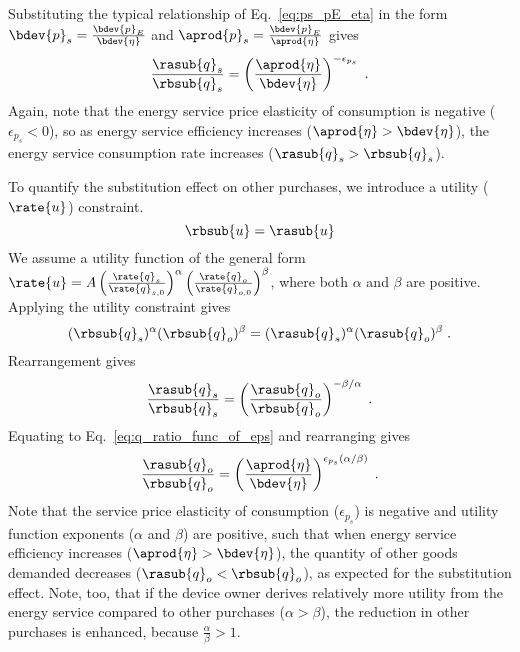 Substituting the typical relationship of Eq.~\ref{eq:ps_pE_eta} in the form
$\bdev{p}_s = \frac{\bdev{p}_E}{\bdev{\eta}}$ and
$\aprod{p}_s = \frac{\bdev{p}_E}{\aprod{\eta}}$
gives 
%
\begin{equation} \label{eq:q_ratio_func_of_eps}
  \frac{\rasub{q}_s}{\rbsub{q}_s} = \left( \frac{\aprod{\eta}}{\bdev{\eta}} \right)^{-\epsilon_{p_s}} \; .
\end{equation}
%
Again, note that the energy service price elasticity of consumption
is negative ($\epsilon_{p_s} < 0$), so
as energy service efficiency increases ($\aprod{\eta} > \bdev{\eta}$),
the energy service consumption rate increases ($\rasub{q}_s > \rbsub{q}_s$).

To quantify the substitution effect on other purchases,
we introduce a utility ($\rate{u}$) constraint.
%
\begin{equation}
  \rbsub{u} = \rasub{u}
\end{equation}
%
We assume a utility function of the general form
$\rate{u} = A \left( \frac{\rate{q}_s}{\rate{q}_{s,0}} \right)^\alpha \left( \frac{\rate{q}_o}{\rate{q}_{o,0}} \right)^\beta$,
where both $\alpha$ and $\beta$ are positive.
Applying the utility constraint gives
%
\begin{equation}
  (\rbsub{q}_s)^\alpha (\rbsub{q}_o)^\beta = (\rasub{q}_s)^\alpha (\rasub{q}_o)^\beta \; .
\end{equation}
%
Rearrangement gives
%
\begin{equation}
  \frac{\rasub{q}_s}{\rbsub{q}_s} = \left( \frac{\rasub{q}_o}{\rbsub{q}_o} \right) ^ {- \beta / \alpha } \; .
\end{equation}
%
Equating to Eq.~\ref{eq:q_ratio_func_of_eps} and rearranging gives
%
\begin{equation} \label{eq:qohat_qostar}
  \frac{\rasub{q}_o}{\rbsub{q}_o} = \left( \frac{\aprod{\eta}}{\bdev{\eta}}\right) ^ {\epsilon_{p_s} (\alpha / \beta)} \; .
\end{equation}
%
Note that the service price elasticity of consumption ($\epsilon_{p_s}$)
is negative and utility function exponents ($\alpha$ and $\beta$) are positive, such that
when energy service efficiency increases ($\aprod{\eta} > \bdev{\eta}$),
the quantity of other goods demanded decreases ($\rasub{q}_o < \rbsub{q}_o$),
as expected for the substitution effect.
Note, too, that if the device owner derives relatively more utility 
from the energy service compared to other purchases ($\alpha > \beta$), 
the reduction in other purchases is enhanced, because $\frac{\alpha}{\beta} > 1$.

